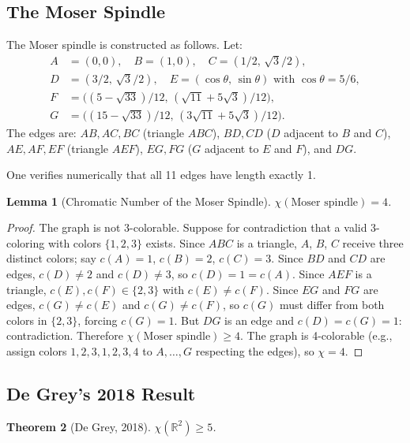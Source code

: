 \documentclass[12pt,a4paper]{amsart}
\newtheorem{theorem}{Theorem}[section]
\newtheorem{lemma}[theorem]{Lemma}
\theoremstyle{definition}
\theoremstyle{remark}
\newcommand{\R}{\mathbb{R}}
\newcommand{\chr}{\chi}
\begin{document}
\subsection{The Moser Spindle}

The Moser spindle is constructed as follows. Let:
\begin{align*}
  A &= (0, 0), \quad B = (1, 0), \quad C = (1/2,\, \sqrt{3}/2),\\
  D &= (3/2,\, \sqrt{3}/2), \quad E = (\cos\theta,\, \sin\theta)
      \text{ with } \cos\theta = 5/6,\\
  F &= \bigl((5-\sqrt{33})/12,\, (\sqrt{11}+5\sqrt{3})/12\bigr),\\
  G &= \bigl((15-\sqrt{33})/12,\, (3\sqrt{11}+5\sqrt{3})/12\bigr).
\end{align*}
The edges are: $AB, AC, BC$ (triangle $ABC$), $BD, CD$ ($D$ adjacent to $B$
and $C$), $AE, AF, EF$ (triangle $AEF$), $EG, FG$ ($G$ adjacent to $E$ and
$F$), and $DG$.

One verifies numerically that all 11 edges have length exactly 1.

\begin{lemma}[Chromatic Number of the Moser Spindle]
$\chr(\text{Moser spindle}) = 4$.
\end{lemma}

\begin{proof}
The graph is not 3-colorable. Suppose for contradiction that a valid
3-coloring with colors $\{1, 2, 3\}$ exists. Since $ABC$ is a triangle,
$A$, $B$, $C$ receive three distinct colors; say $c(A) = 1$, $c(B) = 2$,
$c(C) = 3$. Since $BD$ and $CD$ are edges, $c(D) \ne 2$ and $c(D) \ne 3$,
so $c(D) = 1 = c(A)$. Since $AEF$ is a triangle, $c(E), c(F) \in \{2, 3\}$
with $c(E) \ne c(F)$. Since $EG$ and $FG$ are edges, $c(G) \ne c(E)$ and
$c(G) \ne c(F)$, so $c(G)$ must differ from both colors in $\{2,3\}$, forcing
$c(G) = 1$. But $DG$ is an edge and $c(D) = c(G) = 1$: contradiction.
Therefore $\chr(\text{Moser spindle}) \ge 4$. The graph is 4-colorable (e.g.,
assign colors $1,2,3,1,2,3,4$ to $A,\ldots,G$ respecting the edges), so
$\chr = 4$.
\end{proof}

\subsection{De Grey's 2018 Result}

\begin{theorem}[De Grey, 2018]
\label{thm:degrey}
$\chr(\R^2) \ge 5$.
\end{theorem}
\end{document}
